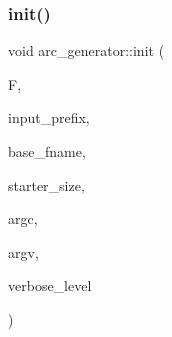 \subsubsection{\texorpdfstring{init()}{init()}}
{\footnotesize\ttfamily void arc\+\_\+generator\+::init (\begin{DoxyParamCaption}\item[{\mbox{\hyperlink{classfinite__field}{finite\+\_\+field}} $\ast$}]{F,  }\item[{const \mbox{\hyperlink{galois_8h_ab6cc7b4aeb6ea31aba2b3fbfc83ff5e6}{B\+Y\+TE}} $\ast$}]{input\+\_\+prefix,  }\item[{const \mbox{\hyperlink{galois_8h_ab6cc7b4aeb6ea31aba2b3fbfc83ff5e6}{B\+Y\+TE}} $\ast$}]{base\+\_\+fname,  }\item[{\mbox{\hyperlink{galois_8h_a09fddde158a3a20bd2dcadb609de11dc}{I\+NT}}}]{starter\+\_\+size,  }\item[{int}]{argc,  }\item[{const char $\ast$$\ast$}]{argv,  }\item[{\mbox{\hyperlink{galois_8h_a09fddde158a3a20bd2dcadb609de11dc}{I\+NT}}}]{verbose\+\_\+level }\end{DoxyParamCaption})}

\mbox{\label{classarc__generator_a1078fb020754103ae2a648c146e32320}} 
